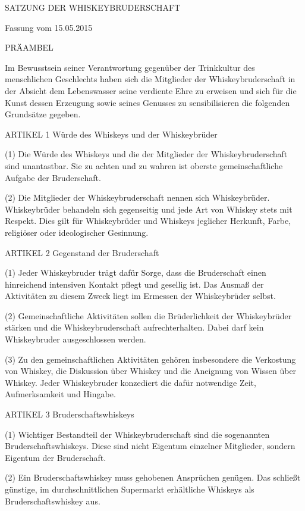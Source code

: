 SATZUNG DER WHISKEYBRUDERSCHAFT

Fassung vom 15.05.2015



    PRÄAMBEL

Im Bewusstsein seiner Verantwortung gegenüber der Trinkkultur des menschlichen Geschlechts haben sich die Mitglieder der Whiskeybruderschaft in der Absicht dem Lebenswasser seine verdiente Ehre zu erweisen und sich für die Kunst dessen Erzeugung sowie seines Genusses zu sensibilisieren die folgenden Grundsätze gegeben.



    ARTIKEL 1
    Würde des Whiskeys und der Whiskeybrüder

(1) Die Würde des Whiskeys und die der Mitglieder der Whiskeybruderschaft sind unantastbar. Sie zu achten und zu wahren ist oberste gemeinschaftliche Aufgabe der Bruderschaft.

(2) Die Mitglieder der Whiskeybruderschaft nennen sich Whiskeybrüder. Whiskeybrüder behandeln sich gegenseitig und jede Art von Whiskey stets mit Respekt. Dies gilt für Whiskeybrüder und Whiskeys jeglicher Herkunft, Farbe, religiöser oder ideologischer Gesinnung.



    ARTIKEL 2
    Gegenstand der Bruderschaft

(1) Jeder Whiskeybruder trägt dafür Sorge, dass die Bruderschaft einen hinreichend intensiven Kontakt pflegt und gesellig ist. Das Ausmaß der Aktivitäten zu diesem Zweck liegt im Ermessen der Whiskeybrüder selbst.

(2) Gemeinschaftliche Aktivitäten sollen die Brüderlichkeit der Whiskeybrüder stärken und die Whiskeybruderschaft aufrechterhalten. Dabei darf kein Whiskeybruder ausgeschlossen werden.

(3) Zu den gemeinschaftlichen Aktivitäten gehören insbesondere die Verkostung von Whiskey, die Diskussion über Whiskey und die Aneignung von Wissen über Whiskey. Jeder Whiskeybruder konzediert die dafür notwendige Zeit, Aufmerksamkeit und Hingabe.



    ARTIKEL 3
    Bruderschaftswhiskeys

(1) Wichtiger Bestandteil der Whiskeybruderschaft sind die sogenannten Bruderschaftswhiskeys. Diese sind nicht Eigentum einzelner Mitglieder, sondern Eigentum der Bruderschaft.

(2) Ein Bruderschaftswhiskey muss gehobenen Ansprüchen genügen. Das schließt günstige, im durchschnittlichen Supermarkt erhältliche Whiskeys als Bruderschaftswhiskey aus.


